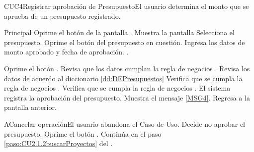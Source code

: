 	\begin{UseCase}{CUC4}{Registrar aprobación de Presupuesto}{El usuario determina el monto que se aprueba de un presupuesto registrado.}
	\end{UseCase}

	\begin{UCtrayectoria}{Principal}
			\UCpaso[\UCactor] Oprime el botón   de la pantalla .
			\UCpaso Muestra la pantalla  
			\UCpaso[\UCactor] Selecciona el presupuesto.
      \UCpaso[\UCactor] Oprime el botón  del presupuesto en cuestión.
			\UCpaso[\UCactor] Ingresa los datos de monto aprobado y fecha de aprobación.  \label{paso:CUC4ingresarDatos}.

			\UCpaso [\UCactor] Oprime el botón  .
			\UCpaso Revisa que los datos cumplan la regla de negocios . 
			\UCpaso Revisa los datos de acuerdo al diccionario \ref{dd:DEPresupuestos} 
			\UCpaso Verifica que se cumpla la regla de negocios .  
      \UCpaso Verifica que se cumpla la regla de negocios .     
			\UCpaso El sistema registra la aprobación del presupuesto.
			\UCpaso Muestra el mensaje \ref{MSG4}.
			\UCpaso Regresa a la pantalla anterior.
	\end{UCtrayectoria}
	\newpage
	\begin{UCtrayectoriaA}{A}{Cancelar operación}{El usuario abandona el Caso de Uso.}
			\UCpaso[\UCactor] Decide no aprobar el presupuesto.
			\UCpaso[\UCactor] Oprime el botón .
			\UCpaso Continúa en el paso \ref{paso:CU2.1.2buscarProyectos} del .
	\end{UCtrayectoriaA}
		
